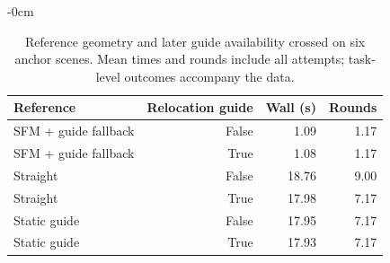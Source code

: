 \documentclass[electronics,article,submit,moreauthors]{Definitions/mdpi}
\begin{document}
\begin{table}[htbp]
\begin{adjustwidth}{-\extralength}{0cm}
\begin{mdframed}[linecolor=RevisionBlue,linewidth=.65pt,innerleftmargin=2pt,innerrightmargin=2pt,innertopmargin=3pt,innerbottommargin=3pt]
\color{RevisionBlue}
\setlength{\textwidth}{\linewidth}\setlength{\fulllength}{\linewidth}

\caption{Reference geometry and later guide availability crossed on six anchor scenes. Mean times and rounds include all attempts; task-level outcomes accompany the data.\label{tab:initialization-new}}
\centering\small
\begin{tabular}{lrrr}\toprule
Reference & Relocation guide & Wall (s) & Rounds\\\midrule
SFM + guide fallback & False & 1.09 & 1.17\\
SFM + guide fallback & True & 1.08 & 1.17\\
Straight & False & 18.76 & 9.00\\
Straight & True & 17.98 & 7.17\\
Static guide & False & 17.95 & 7.17\\
Static guide & True & 17.93 & 7.17\\
\bottomrule\end{tabular}
\end{mdframed}
\end{adjustwidth}
\end{table}
\end{document}
